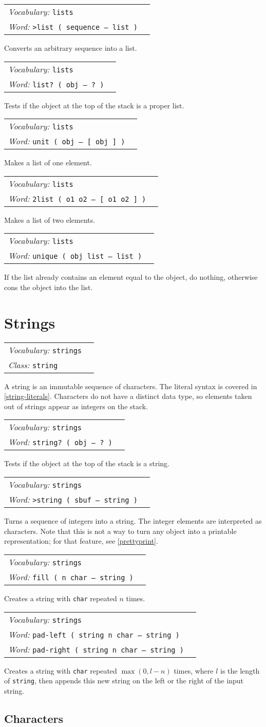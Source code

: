 \documentclass{book}
\newcommand{\vocabulary}[1]{\emph{Vocabulary:} \texttt{#1}&\\}
\newcommand{\ordinaryword}[2]{\index{\texttt{#1}}\emph{Word:} \texttt{#2}&\\}
\newcommand{\classword}[1]{\index{\texttt{#1}}\emph{Class:} \texttt{#1}&\\}
\newcommand{\wordtable}[1]{


\begin{tabularx}{12cm}{lX}
\hline
#1
\hline
\end{tabularx}

}
\begin{document}
\wordtable{
\vocabulary{lists}
\ordinaryword{>list}{>list ( sequence -- list )}
}
Converts an arbitrary sequence into a list.
\wordtable{
\vocabulary{lists}
\ordinaryword{list?}{list?~( obj -- ?~)}
}
Tests if the object at the top of the stack is a proper list.
\wordtable{
\vocabulary{lists}
\ordinaryword{unit}{unit ( obj -- [ obj ] )}
}
Makes a list of one element.
\wordtable{
\vocabulary{lists}
\ordinaryword{2list}{2list ( o1 o2 -- [ o1 o2 ] )}
}
Makes a list of two elements.
\wordtable{
\vocabulary{lists}
\ordinaryword{unique}{unique ( obj list -- list )}
}
If the list already contains an element equal to the object, do nothing, otherwise cons the object into the list.

\section{Strings}\label{strings}

\stringglos
\wordtable{
\vocabulary{strings}
\classword{string}
}
A string is an immutable sequence of characters. The literal syntax is covered in \ref{string-literals}. Characters do not have a distinct data type, so elements taken out of strings appear as integers on the stack.

\wordtable{
\vocabulary{strings}
\ordinaryword{string?}{string?~( obj -- ?~)}

}
Tests if the object at the top of the stack is a string.

\wordtable{
\vocabulary{strings}
\ordinaryword{>string}{>string~( sbuf -- string )}
}
Turns a sequence of integers into a string. The integer elements are interpreted as characters. Note that this is not a way to turn any object into a printable representation; for that feature, see \ref{prettyprint}.

\wordtable{
\vocabulary{strings}
\ordinaryword{fill}{fill~( n char -- string )}

}
Creates a string with \texttt{char} repeated $n$ times.
\wordtable{
\vocabulary{strings}
\ordinaryword{pad-left}{pad-left~( string n char -- string )}
\ordinaryword{pad-right}{pad-right~( string n char -- string )}

}
Creates a string with \texttt{char} repeated $\max(0,l-n)$ times, where $l$ is the length of \texttt{string}, then appends this new string on the left or the right of the input string.

\subsection{Characters}
\end{document}
